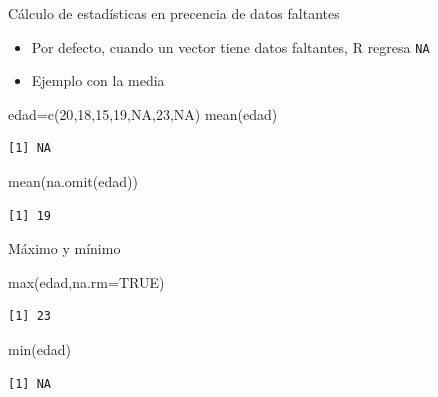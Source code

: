 \documentclass[
  ignorenonframetext,
  aspectratio=169,
  spanish,
]{beamer}
\newenvironment{Shaded}{\begin{snugshade}}{\end{snugshade}}
\newcommand{\AttributeTok}[1]{\textcolor[rgb]{0.40,0.45,0.13}{#1}}
\newcommand{\ConstantTok}[1]{\textcolor[rgb]{0.56,0.35,0.01}{#1}}
\newcommand{\DecValTok}[1]{\textcolor[rgb]{0.68,0.00,0.00}{#1}}
\newcommand{\FunctionTok}[1]{\textcolor[rgb]{0.28,0.35,0.67}{#1}}
\newcommand{\NormalTok}[1]{\textcolor[rgb]{0.00,0.23,0.31}{#1}}
\newcommand{\OtherTok}[1]{\textcolor[rgb]{0.00,0.23,0.31}{#1}}
\begin{document}
\begin{frame}[fragile]{Cálculo de estadísticas en precencia de datos
faltantes}
\label{cuxe1lculo-de-estaduxedsticas-en-precencia-de-datos-faltantes}
\begin{itemize}
\item
  Por defecto, cuando un vector tiene datos faltantes, R regresa
  \texttt{NA}
\item
  Ejemplo con la media
\end{itemize}

\begin{Shaded}
\begin{Highlighting}[]
\NormalTok{edad}\OtherTok{=}\FunctionTok{c}\NormalTok{(}\DecValTok{20}\NormalTok{,}\DecValTok{18}\NormalTok{,}\DecValTok{15}\NormalTok{,}\DecValTok{19}\NormalTok{,}\ConstantTok{NA}\NormalTok{,}\DecValTok{23}\NormalTok{,}\ConstantTok{NA}\NormalTok{)}
\FunctionTok{mean}\NormalTok{(edad)}
\end{Highlighting}
\end{Shaded}

\begin{verbatim}
[1] NA
\end{verbatim}

\begin{Shaded}
\begin{Highlighting}[]
\FunctionTok{mean}\NormalTok{(}\FunctionTok{na.omit}\NormalTok{(edad))  }
\end{Highlighting}
\end{Shaded}

\begin{verbatim}
[1] 19
\end{verbatim}
\end{frame}

\begin{frame}[fragile]{Máximo y mínimo}
\label{muxe1ximo-y-muxednimo}
\begin{Shaded}
\begin{Highlighting}[]
\FunctionTok{max}\NormalTok{(edad,}\AttributeTok{na.rm=}\ConstantTok{TRUE}\NormalTok{)}
\end{Highlighting}
\end{Shaded}

\begin{verbatim}
[1] 23
\end{verbatim}

\begin{Shaded}
\begin{Highlighting}[]
\FunctionTok{min}\NormalTok{(edad)}
\end{Highlighting}
\end{Shaded}

\begin{verbatim}
[1] NA
\end{verbatim}
\end{frame}
\end{document}
